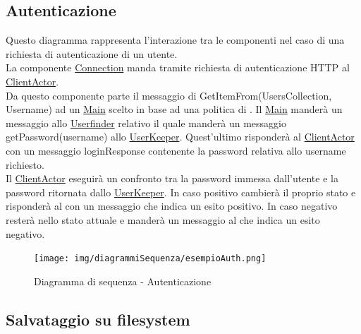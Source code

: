 \documentclass{scalatekids-article}
\begin{document}
\subsection{Autenticazione}

Questo diagramma rappresenta l'interazione tra le componenti nel caso di una richiesta di autenticazione di un utente.\\
La componente \hyperref[sec:actorbase::driver::client::Connection]{Connection}
manda tramite richiesta di autenticazione HTTP al \hyperref[sec:actorbase::actorsystem::actors::clientactor::ClientActor]{ClientActor}.\\
Da questo componente parte il messaggio di GetItemFrom(UsersCollection, Username) ad un \hyperref[sec:actorbase::actorsystem::actors::main::Main]{Main}
scelto in base ad una politica di .
Il \hyperref[sec:actorbase::actorsystem::actors::main::Main]{Main} manderà un messaggio allo \hyperref[sec:actorbase::actorsystem::actors::userfinder::Userfinder]{Userfinder}
relativo il quale manderà un messaggio getPassword(username) allo \hyperref[sec:actorbase::actorsystem::actors::userkeeper::UserKeeper]{UserKeeper}.
Quest'ultimo risponderà al \hyperref[sec:actorbase::actorsystem::actors::clientactor::ClientActor]{ClientActor} con un messaggio
loginResponse contenente la password relativa allo username richiesto.\\
Il \hyperref[sec:actorbase::actorsystem::actors::clientactor::ClientActor]{ClientActor} eseguirà un confronto tra la password immessa dall'utente
e la password ritornata dallo \hyperref[sec:actorbase::actorsystem::actors::userkeeper::UserKeeper]{UserKeeper}.
In caso positivo cambierà il proprio stato e risponderà al  con un messaggio che indica un esito positivo.
In caso negativo resterà nello stato attuale e manderà un messaggio al  che indica un esito negativo.
\begin{figure}[H]
  \begin{center}
    \texttt{[image: img/diagrammiSequenza/esempioAuth.png]}
    \caption{Diagramma di sequenza - Autenticazione}
  \end{center}
\end{figure}

\subsection{Salvataggio su filesystem}
\end{document}
